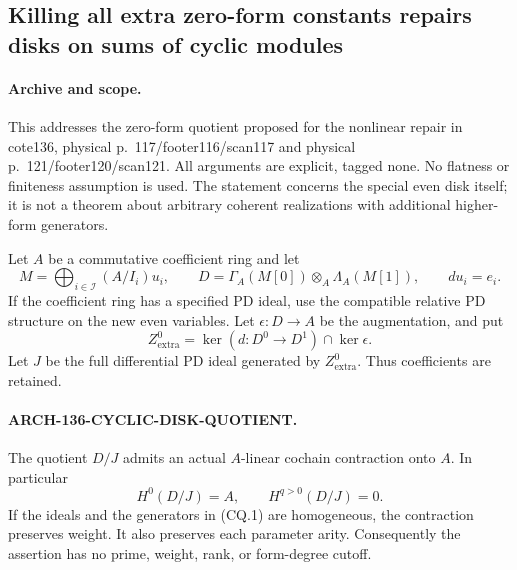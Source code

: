 \subsection{Killing all extra zero-form constants repairs disks on sums of cyclic modules}
\label{arch136:cyclic-disk-quotient}

\paragraph{Archive and scope.}
This addresses the zero-form quotient proposed for the nonlinear
repair in cote136, physical p.~117/footer116/scan117 and
physical p.~121/footer120/scan121. All arguments are explicit,
tagged none. No flatness or finiteness assumption is used.
The statement concerns the special even disk itself; it is
not a theorem about arbitrary coherent realizations with
additional higher-form generators.

Let \(A\) be a commutative coefficient ring and let
\[
 M=\bigoplus_{i\in\mathcal I}(A/I_i)u_i,
 \qquad
 D=\Gamma_A(M[0])\otimes_A\Lambda_A(M[1]),
 \qquad du_i=e_i.                                      \tag{CQ.1}
\]
If the coefficient ring has a specified PD ideal, use the
compatible relative PD structure on the new even variables.
Let \(\epsilon:D\to A\) be the augmentation, and put
\[
 Z_{\mathrm{extra}}^0=\ker(d:D^0\to D^1)\cap\ker\epsilon.
                                                               \tag{CQ.2}
\]
Let \(J\) be the full differential PD ideal generated by
\(Z_{\mathrm{extra}}^0\). Thus coefficients are retained.

\paragraph{ARCH-136-CYCLIC-DISK-QUOTIENT.}
The quotient \(D/J\) admits an actual \(A\)-linear cochain
contraction onto \(A\). In particular
\[
                H^0(D/J)=A,\qquad H^{q>0}(D/J)=0.        \tag{CQ.3}
\]
If the ideals and the generators in (CQ.1) are homogeneous,
the contraction preserves weight. It also preserves each
parameter arity. Consequently the assertion has no prime,
weight, rank, or form-degree cutoff.

